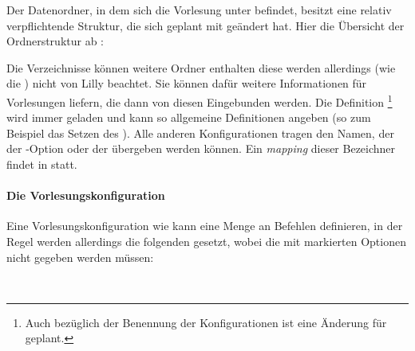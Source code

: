 Der Datenordner, in dem sich die Vorlesung unter  befindet, besitzt eine relativ verpflichtende Struktur, die sich geplant mit  geändert hat. Hier die Übersicht der Ordnerstruktur ab :\par
\begin{minipage}{0.65\linewidth}Die Verzeichnisse können weitere Ordner enthalten diese werden allerdings (wie die ) nicht von Lilly beachtet. Sie können dafür weitere Informationen für Vorlesungen liefern, die dann von diesen Eingebunden werden. Die Definition \footnote{Auch bezüglich der Benennung der Konfigurationen ist eine Änderung für  geplant.} wird immer geladen und kann so allgemeine Definitionen angeben (so zum Beispiel das Setzen des ). Alle anderen Konfigurationen tragen den Namen, der der -Option  oder der \Jake[-]  übergeben werden können. Ein \emph{mapping} dieser Bezeichner findet in  statt.

\paragraph{Die Vorlesungskonfiguration}
Eine Vorlesungskonfiguration wie  kann eine Menge an Befehlen definieren, in der Regel werden allerdings die folgenden gesetzt, wobei die mit  markierten Optionen nicht gegeben werden müssen:
\end{minipage}\begin{minipage}{0.35\linewidth}
    \centering{}
\end{minipage}
\\
